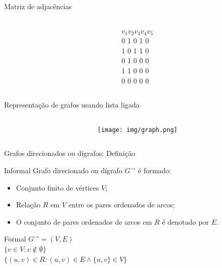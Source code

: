\documentclass[handout]{beamer}
\begin{document}
\begin{frame}{Matriz de adjacências}

\begin{columns}
\begin{column}{0.6\textwidth}
	
\end{column}
\begin{column}{0.4\textwidth}
	$v_1  v_2  v_3  v_4  v_5$ \\
 	0  1  0  1  0 \\
 	1  0  1  1  0 \\
 	0  1  0  0  0 \\
 	1  1  0  0  0 \\
 	0  0  0  0  0
\end{column}
\end{columns}

\end{frame}


\begin{frame}{Representação de grafos usando lista ligada}

\begin{columns}
\begin{column}{0.375\textwidth}
	
\end{column}
\begin{column}{0.6\textwidth}
	\texttt{[image: img/graph.png]}
\end{column}
\end{columns}

\end{frame}


\begin{frame}{Grafos direcionados ou dígrafos: Definição}

\begin{block}{Informal}
Grafo direcionado ou dígrafo $G^\rightarrow$ é formado:
\begin{itemize}
\item Conjunto finito de vértices $V$;
\item Relação $R$ em $V$ entre os pares ordenados de arcos;
\item O conjunto de pares ordenados de arcos em $R$ é denotado por $E$.
\end{itemize}
\end{block}

\begin{block}{Formal}
$G^\rightarrow = (V, E)$ \\
$\{v \in V : v \notin \emptyset\}$ \\
$\{ (u, v) \in R : (u, v) \in E \land \{u, v\} \in V\}$ \\
\end{block}

\end{frame}
\end{document}
